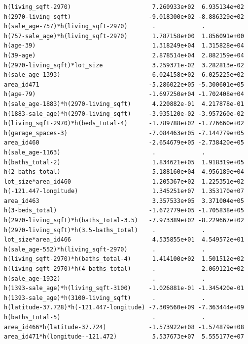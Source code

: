 \documentclass[
]{article}
\begin{document}
\begin{verbatim}
h(living_sqft-2970)                       7.260933e+02  6.935134e+02
h(2970-living_sqft)                      -9.018300e+02 -8.886329e+02
h(sale_age-757)*h(living_sqft-2970)       .             .           
h(757-sale_age)*h(living_sqft-2970)       1.787158e+00  1.856091e+00
h(age-39)                                 1.318249e+04  1.315828e+04
h(39-age)                                 2.878514e+04  2.882159e+04
h(2970-living_sqft)*lot_size              3.259371e-02  3.282813e-02
h(sale_age-1393)                         -6.024158e+02 -6.025225e+02
area_id471                               -5.286022e+05 -5.300601e+05
h(age-79)                                -1.697250e+04 -1.702408e+04
h(sale_age-1883)*h(2970-living_sqft)      4.220882e-01  4.217878e-01
h(1883-sale_age)*h(2970-living_sqft)     -3.935120e-02 -3.957260e-02
h(living_sqft-2970)*h(beds_total-4)      -1.789788e+02 -1.776660e+02
h(garage_spaces-3)                       -7.084463e+05 -7.144779e+05
area_id460                               -2.654679e+05 -2.738420e+05
h(sale_age-1163)                          .             .           
h(baths_total-2)                          1.834621e+05  1.918319e+05
h(2-baths_total)                          5.188160e+04  4.956189e+04
lot_size*area_id460                       1.205367e+02  1.225351e+02
h(-121.447-longitude)                     1.345251e+07  1.353170e+07
area_id463                                3.357533e+05  3.371004e+05
h(3-beds_total)                          -1.672779e+05 -1.705838e+05
h(2970-living_sqft)*h(baths_total-3.5)   -7.973389e+02 -8.229667e+02
h(2970-living_sqft)*h(3.5-baths_total)    .             .           
lot_size*area_id466                       4.535855e+01  4.549572e+01
h(sale_age-552)*h(living_sqft-2970)       .             .           
h(living_sqft-2970)*h(baths_total-4)      1.414100e+02  1.501512e+02
h(living_sqft-2970)*h(4-baths_total)      .             2.069121e+02
h(sale_age-1932)                          .             .           
h(1393-sale_age)*h(living_sqft-3100)     -1.026881e-01 -1.345420e-01
h(1393-sale_age)*h(3100-living_sqft)      .             .           
h(latitude-37.728)*h(-121.447-longitude) -7.309560e+09 -7.363444e+09
h(baths_total-5)                          .             .           
area_id466*h(latitude-37.724)            -1.573922e+08 -1.574879e+08
area_id471*h(longitude--121.472)          5.537673e+07  5.555177e+07
                                                                    

\end{verbatim}
\end{document}
